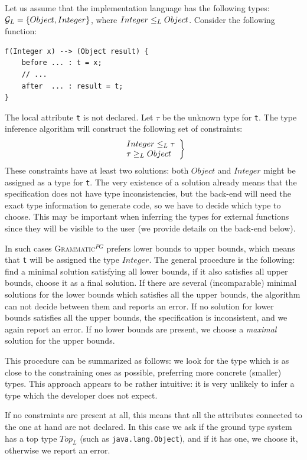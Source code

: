 \documentclass{llncs2e/llncs}
\newcommand{\ATF}{\textsc{Grammatic}$^{PG}$}
\begin{document}
Let us assume that the implementation language has the following types: ${\mathcal{G}_L} = \{Object, Integer\}$, where $Integer \le_L Object$. Consider the following function:
\begin{lstlisting}[language=Grammatic]
f(Integer x) --> (Object result) {
	before ... : t = x;
	// ...
	after  ... : result = t;
}
\end{lstlisting}
The local attribute \texttt{t} is not declared. Let $\tau$ be the unknown type for \texttt{t}. The type inference algorithm will construct the following set of constraints:
$$\left.\begin{array}{l}
Integer \le_L \tau\\
\tau \ge_L Object\\
\end{array}\right\}$$
These constraints have at least two solutions: both $Object$ and $Integer$ might be assigned as a type for \texttt{t}. The very existence of a solution already means that the specification does not have type inconsistencies, but the back-end will need the exact type information to generate code, so we have to decide which type to choose. This may be important when inferring the types for external functions since they will be visible to the user (we provide details on the back-end below).

In such cases \ATF{} prefers lower bounds to upper bounds, which means that \texttt{t} will be assigned the type $Integer$. The general procedure is the following: find a minimal solution satisfying all lower bounds, if it also satisfies all upper bounds, choose it as a final solution. If there are several (incomparable) minimal solutions for the lower bounds which satisfies all the upper bounds, the algorithm can not decide between them and reports an error. If no solution for lower bounds satisfies all the upper bounds, the specification is inconsistent, and we again report an error. If no lower bounds are present, we choose a \emph{maximal} solution for the upper bounds. 

This procedure can be summarized as follows: we look for the type which is as close to the constraining ones as possible, preferring more concrete (smaller) types. This approach appears to be rather intuitive: it is very unlikely to infer a type which the developer does not expect.

If no constraints are present at all, this means that all the attributes connected to the one at hand are not declared. In this case we ask if the ground type system has a top type $Top_L$ (such as \texttt{java.lang.Object}), and if it has one, we choose it, otherwise we report an error.
\end{document}
